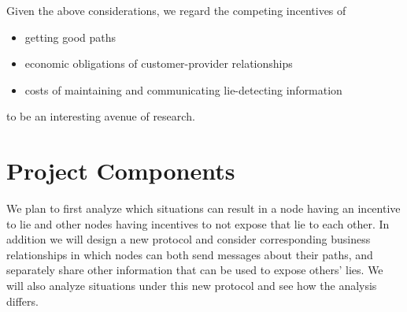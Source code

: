 \documentclass[12pt]{article}
\begin{document}
  Given the above considerations, we regard the competing incentives of
  \begin{itemize}
    \item getting good paths
    \item economic obligations of customer-provider relationships
    \item costs of maintaining and communicating lie-detecting information
  \end{itemize}
  to be an interesting avenue of research.

\section{Project Components}
  We plan to first analyze which situations can result in a node having an
  incentive to lie and other nodes having incentives to not expose that lie to
  each other. In addition we will design a new protocol and consider
  corresponding business relationships in which nodes can both send messages
  about their paths, and separately share other information that can be used to
  expose others' lies. We will also analyze situations under this new protocol
  and see how the analysis differs.



{}

\end{document}
